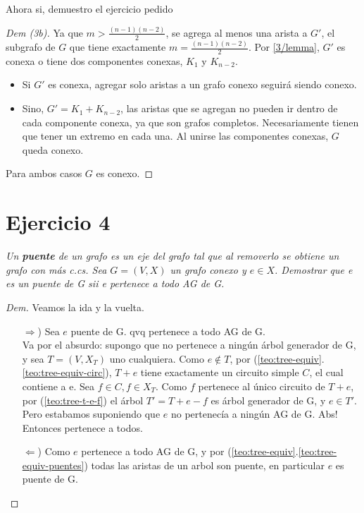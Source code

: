\documentclass[12pt, a4paper]{report}
\theoremstyle{definition} %
\begin{document}
\begin{enumerate}[a)]
    Ahora si, demuestro el ejercicio pedido
    \begin{proof}[Dem (3b)]
        Ya que $m > \frac{(n-1)(n-2)}{2}$, se agrega al menos una arista a $G'$, el subgrafo de $G$ que tiene exactamente $m = \frac{(n-1)(n-2)}{2}$. Por \eqref{3/lemma}, $G'$ es conexa o tiene dos componentes conexas, $K_1$ y $K_{n-2}$.
        
        \begin{itemize}
            \item Si $G'$ es conexa, agregar solo aristas a un grafo conexo seguirá siendo conexo.
            \item Sino, $G' = K_1 + K_{n-2}$, las aristas que se agregan no pueden ir dentro de cada componente conexa, ya que son grafos completos. Necesariamente tienen que tener un extremo en cada una. Al unirse las componentes conexas, $G$ queda conexo.
        \end{itemize}

        Para ambos casos $G$ es conexo.
    \end{proof}
    
\end{enumerate}

\section*{Ejercicio 4}

\textit{Un \textbf{puente} de un grafo es un eje del grafo tal que al removerlo
se obtiene un grafo con más c.cs. Sea $G = (V, X)$ un grafo conexo y $e \in X$.
Demostrar que e es un puente de G sii e pertenece a todo AG de G.}

\begin{proof}[Dem]
    Veamos la ida y la vuelta.

    \begin{enumerate}
        \item[$\Rightarrow$)] Sea $e$ puente de G. qvq pertenece a todo AG de G.\\
        Va por el absurdo: supongo que no pertenece a ningún árbol generador de G, y sea $T = (V, X_T)$ uno cualquiera. Como $e \notin T$, por (\ref{teo:tree-equiv}.\ref{teo:tree-equiv-circ}), $T + e$ tiene exactamente un circuito simple $C$, el cual contiene a e. Sea $f \in C, f \in X_T$. Como $f$ pertenece al único circuito de $T + e$, por (\ref{teo:tree-t-e-f}) el árbol $T' = T + e - f$ es árbol generador de G, y $e \in T'$. Pero estabamos suponiendo que $e$ no pertenecía a ningún AG de G. Abs! Entonces pertenece a todos.

        \item[$\Leftarrow$)] Como $e$ pertenece a todo AG de G, y por
        (\ref{teo:tree-equiv}.\ref{teo:tree-equiv-puentes}) todas las aristas de un arbol son puente, en particular $e$ es puente de G.
    \end{enumerate}

\end{proof}
\end{document}
